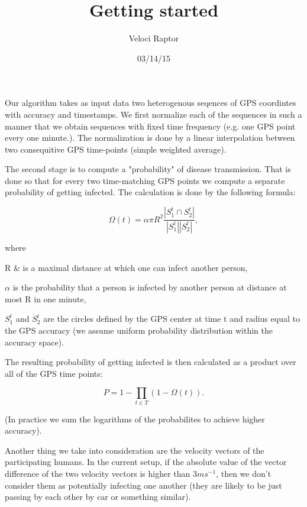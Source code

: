 \documentclass[12pt]{article}
\title{Getting started}
\author{Veloci Raptor}
\date{03/14/15}
\begin{document}
Our algorithm takes as input data two heterogenous seqences of GPS coordintes with accuracy and timestamps.
We first normalize each of the sequences in such a manner that we obtain sequences with fixed time frequency (e.g. one GPS point every one minute.).
The normalization is done by a linear interpolation between two consequitive GPS time-points (simple weighted average).

The second stage is to compute a "probability" of disease transmission. That is done so that for every two time-matching GPS points we compute a separate probability of getting infected. The calculation is done by the following formula:

\begin{equation}
\Omega(t) = \alpha \pi R^2 \frac{|S_{1}^t \cap S_{2}^t|}{|S_1^t| |S_2^t|},
\end{equation}

where

    R & is a maximal distance at which one can infect another person,

    $ \alpha $  is the probability that a person is infected by another person at distance at most R in one minute,

    $ S_1^t $ and $ S_2^t $ are the circles defined by the GPS center at time t and radius equal to the GPS accuracy (we assume uniform probability distribution within the accuracy space).

\newline
\newline
The resulting probability of getting infected is then calculated as a product over all of the GPS time points:

\begin{equation}
P = 1-\prod_{t \in T}(1-\Omega(t)).
\end{equation}

(In practice we sum the logarithms of the probabilites to achieve higher accuracy).

Another thing we take into consideration are the velocity vectors of the participating humans. In the current setup, if the absolute value of the vector difference of the two velocity vectors is higher than $ 3  ms^{-1}$, then we don't consider them as potentially infecting one another (they are likely to be just passing by each other by car or something similar).
\end{document}
